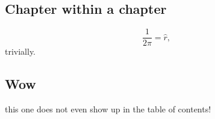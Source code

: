 \subsection{Chapter within a chapter}
    \begin{equation}
        \frac{1}{2\pi} = \hat{r},
    \end{equation}
    trivially.

\subsection*{Wow}
    this one does not even show up in the table of contents!
